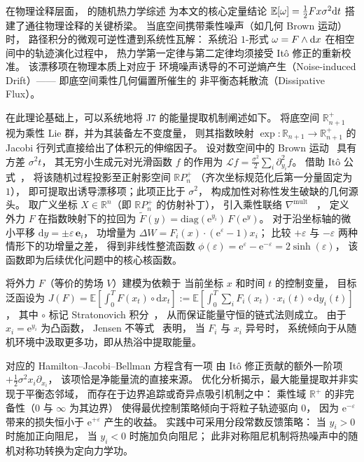 ﻿\documentclass[10pt,a4paper]{article}
\numberwithin{equation}{section}
\begin{document}
在物理诠释层面，\textcite{Seifert2012} 的随机热力学综述
为本文的核心定量结论
$\mathbb E[\omega] = \frac{1}{2}Fx\sigma^2 \text dt$
搭建了通往物理诠释的关键桥梁。
当底空间携带乘性噪声（如几何 Brown 运动）时，
路径积分的微观可逆性遭到系统性瓦解：
系统沿 $1$-形式 $\omega = F \wedge \text dx$
在相空间中的轨迹演化过程中，
热力学第一定律与第二定律均须接受 It\^{o} 修正的重新校准。
该漂移项在物理本质上对应于
环境噪声诱导的不可逆熵产生（Noise-induced Drift）——
即底空间乘性几何偏置所催生的
非平衡态耗散流（Dissipative Flux）。

在此理论基础上，可以系统地将 J7 的能量提取机制阐述如下。
将底空间 $\mathbb R^+_{n+1}$ 视为乘性 Lie 群，并为其装备左不变度量，
则其指数映射 $\exp: \mathbb R_{n+1} \to \mathbb R^+_{n+1}$
的 Jacobi 行列式直接给出了体积元的伸缩因子。
设对数空间中的 Brown 运动~\cite{Nelson1967Dynamical} 
具有方差 $\sigma^2 t$，
其无穷小生成元对光滑函数 $f$ 的作用为
$\mathcal L f = \frac{\sigma^2}{2} \sum_i \partial_{y_i}^2 f$。
借助 It\^{o} 公式~\cite{ItO1951Stochastic,Protter2005Stochastic}，
将该随机过程投影至正射影空间 $\mathbb R P^+_n$
（齐次坐标规范化后第一分量固定为 $1$），
即可提取出诱导漂移项；此项正比于 $\sigma^2$，
构成加性对称性发生破缺的几何源头。
取广义坐标 $X \in \mathbb R^n$（即 $\mathbb R P^+_n$ 的仿射补丁），
引入乘性联络 $\nabla^{\mathrm{mult}}$
~\cite{KobayashiNomizu1963Foundations}，
定义外力 $F$ 在指数映射下的拉回为
$\tilde F(y) = \mathrm{diag}(\mathrm e^{y_i}) \, F(\mathrm e^y)$。
对于沿坐标轴的微小平移 $\mathrm dy = \pm\varepsilon \, \mathbf e_i$，
功增量为 $\Delta W = F_i(x) \cdot (\mathrm e^{\varepsilon} - 1) x_i$；
比较 $+\varepsilon$ 与 $-\varepsilon$ 两种情形下的功增量之差，
得到非线性整流函数
$\phi(\varepsilon) = \mathrm e^{\varepsilon} - \mathrm e^{-\varepsilon} = 2\sinh(\varepsilon)$，
该函数即为后续优化问题中的核心核函数。

将外力 $F$（等价的势场 $V$）建模为依赖于
当前坐标 $x$ 和时间 $t$ 的控制变量，
目标泛函设为
$J(F) = \mathbb E\left[\int_0^T F(x_t)\circ \mathrm dx_t\right]
:= \mathbb E\left[\int_0^T \sum_i F_i(x_t)\cdot x_i(t)\circ \mathrm dy_i(t)\right]$，
其中 $\circ$ 标记 Stratonovich 积分~\cite{Stratonovich1966New}，
从而保证能量守恒的链式法则成立。
由于 $x_i = \mathrm e^{y_i}$ 为凸函数，
Jensen 不等式~\cite{Jensen1906SurLesFonctions} 表明，
当 $F_i$ 与 $x_i$ 异号时，
系统倾向于从随机环境中汲取更多功，即从热浴中提取能量。

对应的 Hamilton--Jacobi--Bellman 方程含有一项
由 It\^{o} 修正贡献的额外一阶项 $+\frac12\sigma^2 x_i \partial_{x_i}$，
该项恰是净能量流的直接来源。
优化分析揭示，最大能量提取并非实现于平衡态邻域，
而存在于边界追踪或奇异点吸引机制之中：
乘性域 $\mathbb R^+$ 的非完备性（$0$ 与 $\infty$ 为其边界）
使得最优控制策略倾向于将粒子轨迹驱向 $0$，
因为 $\mathrm e^{-\varepsilon}$ 带来的损失恒小于 $\mathrm e^{+\varepsilon}$ 产生的收益。
实践中可采用分段常数反馈策略：
当 $y_i > 0$ 时施加正向阻尼，
当 $y_i < 0$ 时施加负向阻尼；
此非对称阻尼机制将热噪声中的随机对称功转换为定向力学功。
\end{document}
